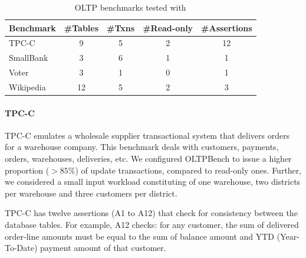 
\begin{table}
  \footnotesize
	\begin{tabular}{|l|c|c|c|c|}
    \hline
		Benchmark & \#Tables & \#Txns &\#Read-only & \#Assertions \\ \hline
		TPC-C &  9 & 5 & 2& 12\\
		SmallBank & 3 & 6 & 1 & 1\\
		Voter & 3 & 1 & 0 & 1\\
		Wikipedia & 12 & 5 & 2 & 3\\
		\hline
	\end{tabular}	
	\caption{OLTP benchmarks tested with \tool{}}
	\label{table-bench}
\end{table}


\paragraph{TPC-C} TPC-C emulates a wholesale supplier transactional system
that delivers orders for a warehouse company.
This benchmark deals with customers, payments, orders, warehouses, 
deliveries, etc. 
We configured OLTPBench to issue a higher proportion ($>85\%$) of update
transactions, compared to read-only ones.  
Further, we considered a small input workload constituting of one warehouse, two
districts per warehouse and three customers per district.


TPC-C has twelve assertions (A1 to A12) that check for consistency between 
the database tables.
For example, A12 checks: for any customer, the sum of delivered order-line
amounts must be equal to the sum of balance amount and YTD (Year-To-Date)
payment amount of that customer.

